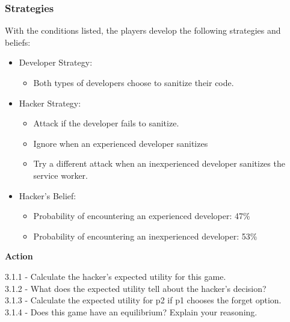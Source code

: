 \documentclass[letterpaper,12pt]{report}
\begin{document}
\subsubsection*{Strategies}

With the conditions listed, the players develop the following strategies and beliefs:

\begin{itemize}
    \item Developer Strategy:
    \begin{itemize}
        \item Both types of developers choose to sanitize their code.
    \end{itemize}
    \item Hacker Strategy:
    \begin{itemize}
        \item Attack if the developer fails to sanitize.
        \item Ignore when an experienced developer sanitizes
        \item Try a different attack when an inexperienced developer sanitizes the service worker.
    \end{itemize}
    \item Hacker's Belief:
    \begin{itemize}
        \item Probability of encountering an experienced developer: 47\%
        \item Probability of encountering an inexperienced developer: 53\%
    \end{itemize}
\end{itemize}

\bigskip
\begin{mdframed}[backgroundcolor=blue!10,style=code,nobreak=true,align=center,userdefinedwidth=14cm]
\textbf{Action}
\bigskip

3.1.1 - Calculate the hacker's expected utility for this game.\\
3.1.2 - What does the expected utility tell about the hacker's decision?\\
3.1.3 - Calculate the expected utility for p2 if p1 chooses the forget option.\\
3.1.4 - Does this game have an equilibrium? Explain your reasoning.
\end{mdframed}
\end{document}
